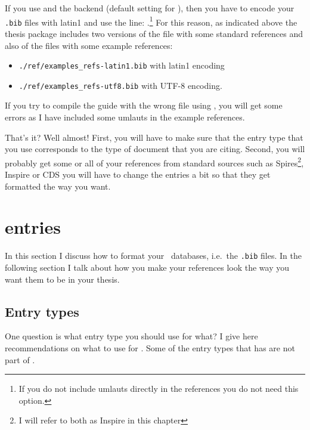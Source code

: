 If you use  and the  backend (default
setting for ), then you have to encode your \texttt{.bib}
files with latin1 and use the line:
.\footnote{%
  If you do not include umlauts directly in the references you do not
  need this option.}
For this reason, as indicated above the thesis package includes two
versions of the file with some standard references and also of the
files with some example references:
\begin{itemize}
\setlength{\parskip}{0pt}\setlength{\itemsep}{0pt}
\item \texttt{./ref/examples\_refs-latin1.bib} with latin1 encoding
\item \texttt{./ref/examples\_refs-utf8.bib} with UTF-8 encoding.
\end{itemize}
If you try to compile the guide with the wrong file using \BibTeX, you
will get some errors as I have included some umlauts in the example
references.

That's it? Well almost! First, you will have to make sure that the
entry type that you use corresponds to the type of document that you
are citing. Second, you will probably get some or all of your
references from standard sources such as Spires\footnote{I
  will refer to both as Inspire in this chapter}, Inspire or CDS you will have
to change the entries a bit so that they get formatted the way you want.


\section{\BibTeX{} entries}
\label{sec:ref:bib}

In this section I discuss how to format your \BibTeX\ databases,
i.e.\ the \texttt{.bib} files. In the following section I talk about
how you make your references look the way you want them to be in your
thesis.

\subsection{Entry types}
\label{sec:ref:entry}

One question is what entry type you should use for what? I give here
recommendations on what to use for . Some of the entry
types that  has are not part of \BibTeX.

